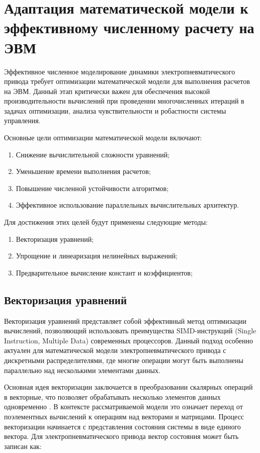 \section{Адаптация математической модели к эффективному численному расчету на ЭВМ}\label{sec:ch2/sec5}

Эффективное численное моделирование динамики электропневматического привода требует
оптимизации математической модели для выполнения расчетов на ЭВМ.
Данный этап критически важен для обеспечения высокой производительности
вычислений при проведении многочисленных итераций в задачах оптимизации,
анализа чувствительности и робастности системы управления.

Основные цели оптимизации математической модели включают:

\begin{enumerate}
    \item Снижение вычислительной сложности уравнений;
    \item Уменьшение времени выполнения расчетов;
    \item Повышение численной устойчивости алгоритмов;
    \item Эффективное использование параллельных вычислительных архитектур.
\end{enumerate}

Для достижения этих целей будут применены следующие методы:

\begin{enumerate}
    \item Векторизация уравнений;
    \item Упрощение и линеаризация нелинейных выражений;
    \item Предварительное вычисление констант и коэффициентов;
\end{enumerate}

\subsection{Векторизация уравнений}\label{sec:ch2/sec5/subsec1}
Векторизация уравнений представляет собой эффективный метод оптимизации вычислений,
позволяющий использовать преимущества SIMD-инструкций (Single Instruction, Multiple Data)
современных процессоров. Данный подход особенно актуален для математической
модели электропневматического привода с дискретными распределителями, где многие операции могут быть выполнены
параллельно \cite*{eichenberger2004simd} над несколькими элементами данных.

Основная идея векторизации заключается в преобразовании скалярных операций в
векторные, что позволяет обрабатывать несколько элементов данных
одновременно \cite*{nuzman2011vaporsimd}. В контексте рассматриваемой модели это означает переход от
поэлементных вычислений к операциям над векторами и матрицами.
Процесс векторизации начинается с представления состояния системы
в виде единого вектора. Для электропневматического привода
вектор состояния может быть записан как:

